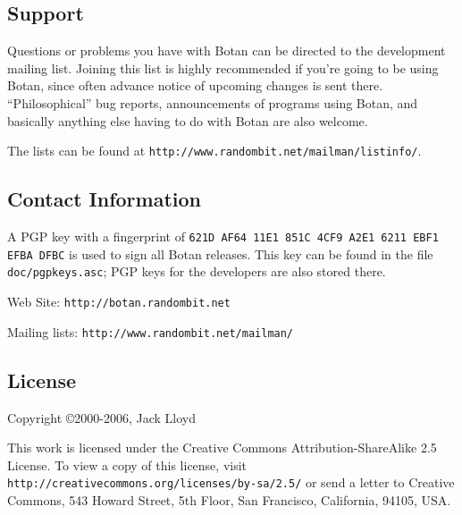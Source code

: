 \documentclass{article}
\newcommand{\filename}[1]{\texttt{#1}}
\newcommand{\url}[1]{\texttt{#1}}
\begin{document}
\subsection{Support}

Questions or problems you have with Botan can be directed to the
development mailing list. Joining this list is highly recommended if
you're going to be using Botan, since often advance notice of upcoming
changes is sent there. ``Philosophical'' bug reports, announcements of
programs using Botan, and basically anything else having to do with
Botan are also welcome.

The lists can be found at
\url{http://www.randombit.net/mailman/listinfo/}.

\subsection{Contact Information}

A PGP key with a fingerprint of
\verb|621D AF64 11E1 851C 4CF9 A2E1 6211 EBF1 EFBA DFBC| is used to sign all
Botan releases. This key can be found in the file \filename{doc/pgpkeys.asc};
PGP keys for the developers are also stored there.

\vskip 5pt \noindent
Web Site: \url{http://botan.randombit.net}

\vskip 5pt \noindent
Mailing lists: \url{http://www.randombit.net/mailman/}

\subsection{License}

Copyright \copyright  2000-2006, Jack Lloyd

This work is licensed under the Creative Commons
Attribution-ShareAlike 2.5 License. To view a copy of this license,
visit \url{http://creativecommons.org/licenses/by-sa/2.5/} or send a
letter to Creative Commons, 543 Howard Street, 5th Floor, San
Francisco, California, 94105, USA.
\end{document}
